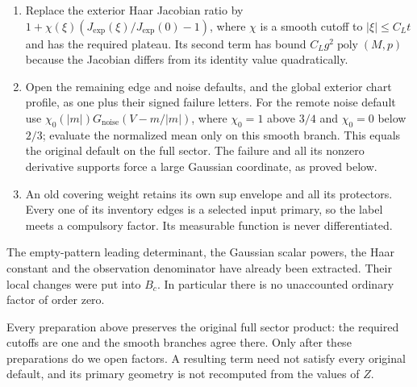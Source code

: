\begin{enumerate}
\item Replace the exterior Haar Jacobian ratio by
$1+\chi(\xi)(J_{\exp}(\xi)/J_{\exp}(0)-1)$, where $\chi$ is a
smooth cutoff to $|\xi|\le C_Lt$ and has the required plateau.
Its second term has bound $C_Lg^2\operatorname{poly}(M,p)$ because
the Jacobian differs from its identity value quadratically.

\item Open the remaining edge and noise defaults, and the global
exterior chart profile, as one plus their signed failure letters.
For the remote noise default use
$\chi_0(|m|)G_{\mathrm{noise}}(V-m/|m|)$, where $\chi_0=1$ above
$3/4$ and $\chi_0=0$ below $2/3$; evaluate the normalized mean only
on this smooth branch.  This equals the original default on the
full sector.  The failure and all its nonzero derivative supports
force a large Gaussian coordinate, as proved below.

\item An old covering weight retains its own sup envelope and all
its protectors.  Every one of its inventory edges is a selected
input primary, so the label meets a compulsory factor.  Its
measurable function is never differentiated.
\end{enumerate}
The empty-pattern leading determinant, the Gaussian scalar powers,
the Haar constant and the observation denominator have already been
extracted.  Their local changes were put into $B_c$.  In particular
there is no unaccounted ordinary factor of order zero.

Every preparation above preserves the original full sector product:
the required cutoffs are one and the smooth branches agree there.
Only after these preparations do we open factors.  A resulting term
need not satisfy every original default, and its primary geometry is
not recomputed from the values of $Z$.

